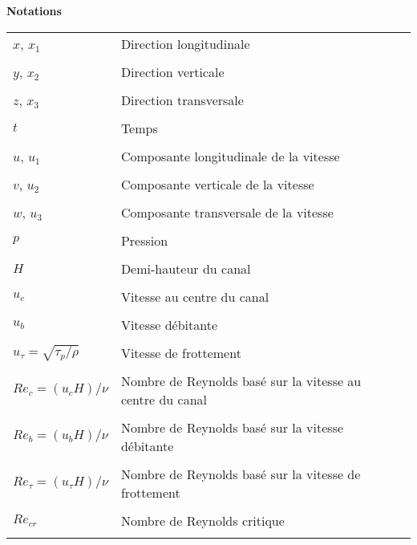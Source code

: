 \noindent \textbf{Notations}
\vspace{-1.25cm}
\begin{center}
\begin{tabular}{ m{3cm} m{11.5cm} m{1cm} } 
\\
$x$, $x_{1}$ & Direction longitudinale &  \\
\\[-2.625em]
$y$, $x_{2}$ & Direction verticale &  \\
\\[-2.625em]
$z$, $x_{3}$ & Direction transversale &  \\
\\[-2.625em]
$t$ & Temps &  \\
\\[-2.625em]
$u$, $u_{1}$ & Composante longitudinale de la vitesse &  \\
\\[-2.625em]
$v$, $u_{2}$ & Composante verticale de la vitesse &  \\
\\[-2.625em]
$w$, $u_{3}$ & Composante transversale de la vitesse &  \\
\\[-2.625em]
$p$ & Pression &  \\
\\[-2.625em]
$H$ & Demi-hauteur du canal &  \\
\\[-2.625em]
$u_{c}$ & Vitesse au centre du canal &  \\
\\[-2.625em]
$u_{b}$ & Vitesse débitante &  \\
\\[-2.625em]
$u_{\tau}=\sqrt{\tau_{p}/\rho}$ & Vitesse de frottement &  \\
\\[-2.625em]
$Re_{c}=\left( u_{c} H \right) / \nu$ & Nombre de Reynolds basé sur la vitesse au centre du canal &  \\
\\[-2.625em]
$Re_{b}=\left( u_{b} H \right) / \nu$ & Nombre de Reynolds basé sur la vitesse débitante &  \\
\\[-2.625em]
$Re_{\tau}=\left( u_{\tau} H \right) / \nu$ & Nombre de Reynolds basé sur la vitesse de frottement &  \\
\\[-2.625em]
$Re_{cr}$ & Nombre de Reynolds critique &  \\
\\[-2.625em]

\end{tabular}
\end{center}
